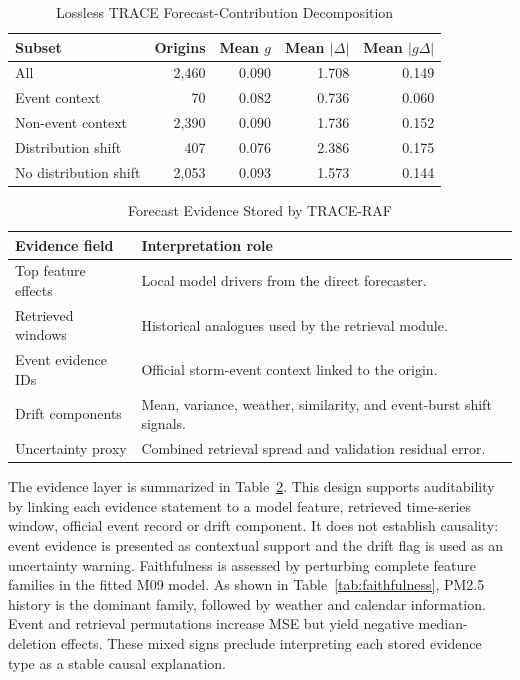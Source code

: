 \documentclass{ieeeaccess}
\begin{document}
\begin{table}[!t]
\centering
\caption{Lossless TRACE Forecast-Contribution Decomposition}
\label{tab:trace_decomposition}
\begin{tabular}{lrrrr}
\toprule
Subset & Origins & Mean $g$ & Mean $|\Delta|$ & Mean $|g\Delta|$ \\
\midrule
All & 2,460 & 0.090 & 1.708 & 0.149 \\
Event context & 70 & 0.082 & 0.736 & 0.060 \\
Non-event context & 2,390 & 0.090 & 1.736 & 0.152 \\
Distribution shift & 407 & 0.076 & 2.386 & 0.175 \\
No distribution shift & 2,053 & 0.093 & 1.573 & 0.144 \\
\bottomrule
\end{tabular}
\end{table}

\begin{table}[!t]
\centering
\caption{Forecast Evidence Stored by TRACE-RAF}
\label{tab:explainability_outputs}
\begin{tabular}{p{}p{}}
\toprule
Evidence field & Interpretation role \\
\midrule
Top feature effects & Local model drivers from the direct forecaster. \\
Retrieved windows & Historical analogues used by the retrieval module. \\
Event evidence IDs & Official storm-event context linked to the origin. \\
Drift components & Mean, variance, weather, similarity, and event-burst shift signals. \\
Uncertainty proxy & Combined retrieval spread and validation residual error. \\
\bottomrule
\end{tabular}
\end{table}

The evidence layer is summarized in Table~\ref{tab:explainability_outputs}. This design supports auditability by linking each evidence statement to a model feature, retrieved time-series window, official event record or drift component. It does not establish causality: event evidence is presented as contextual support and the drift flag is used as an uncertainty warning. Faithfulness is assessed by perturbing complete feature families in the fitted M09 model. As shown in Table~\ref{tab:faithfulness}, PM2.5 history is the dominant family, followed by weather and calendar information. Event and retrieval permutations increase MSE but yield negative median-deletion effects. These mixed signs preclude interpreting each stored evidence type as a stable causal explanation.
\end{document}
